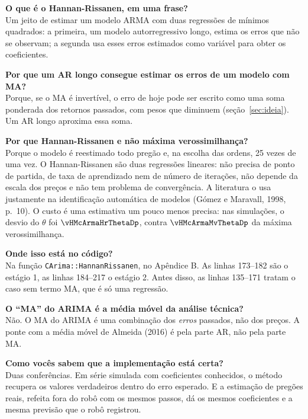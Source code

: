 \documentclass[11pt,a4paper]{article}
\begin{document}
\begin{banca}
\textbf{O que é o Hannan-Rissanen, em uma frase?}\\
Um jeito de estimar um modelo ARMA com duas regressões de mínimos quadrados: a primeira, um modelo autorregressivo
longo, estima os erros que não se observam; a segunda usa esses erros estimados como variável para obter os
coeficientes.

\medskip
\textbf{Por que um AR longo consegue estimar os erros de um modelo com MA?}\\
Porque, se o MA é invertível, o erro de hoje pode ser escrito como uma soma ponderada dos retornos passados, com pesos
que diminuem (seção~\ref{sec:ideia}). Um AR longo aproxima essa soma.

\medskip
\textbf{Por que Hannan-Rissanen e não máxima verossimilhança?}\\
Porque o modelo é reestimado todo pregão e, na escolha das ordens, 25 vezes de uma vez. O Hannan-Rissanen são duas
regressões lineares: não precisa de ponto de partida, de taxa de aprendizado nem de número de iterações, não depende
da escala dos preços e não tem problema de convergência. A literatura o usa justamente na identificação automática de
modelos (Gómez e Maravall, 1998, p.~10). O custo é uma estimativa um pouco menos precisa: nas simulações, o desvio do
$\theta$ foi $\vHMcArmaHrThetaDp$, contra $\vHMcArmaMvThetaDp$ da máxima verossimilhança.

\medskip
\textbf{Onde isso está no código?}\\
Na função \texttt{CArima::HannanRissanen}, no Apêndice B. As linhas 173--182 são o estágio 1, as linhas 184--217 o
estágio 2. Antes disso, as linhas 135--171 tratam o caso sem termo MA, que é só uma regressão.

\medskip
\textbf{O ``MA'' do ARIMA é a média móvel da análise técnica?}\\
Não. O MA do ARIMA é uma combinação dos \emph{erros} passados, não dos preços. A ponte com a média móvel de Almeida
(2016) é pela parte AR, não pela parte MA.

\medskip
\textbf{Como vocês sabem que a implementação está certa?}\\
Duas conferências. Em série simulada com coeficientes conhecidos, o método recupera os valores verdadeiros dentro do
erro esperado. E a estimação de pregões reais, refeita fora do robô com os mesmos passos, dá os mesmos coeficientes e
a mesma previsão que o robô registrou.
\end{banca}
\end{document}
